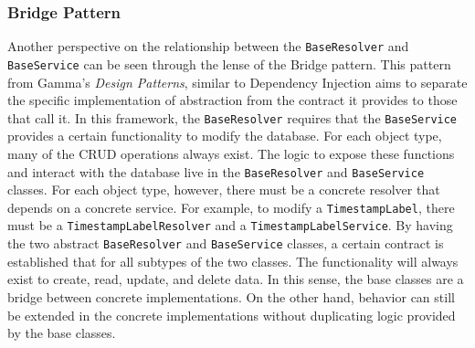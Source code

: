 \subsubsection{Bridge Pattern}
Another perspective on the relationship between the \verb!BaseResolver! and \verb!BaseService! can be seen through the lense of the Bridge pattern.  This pattern from Gamma's \textit{Design Patterns}, similar to Dependency Injection aims to separate the specific implementation of abstraction from the contract it provides to those that call it. In this framework, the \verb!BaseResolver! requires that the \verb!BaseService! provides a certain functionality to modify the database.  For each object type, many of the CRUD operations always exist.  The logic to expose these functions and interact with the database live in the \verb!BaseResolver! and \verb!BaseService! classes.  For each object type, however, there must be a concrete resolver that depends on a concrete service. For example, to modify a \verb!TimestampLabel!, there must be a \verb!TimestampLabelResolver! and a \verb!TimestampLabelService!.  By having the two abstract \verb!BaseResolver! and \verb!BaseService! classes, a certain contract is established that for all subtypes of the two classes. The functionality will always exist to create, read, update, and delete data.  In this sense, the base classes are a bridge between concrete implementations. On the other hand, behavior can still be extended in the concrete implementations without duplicating logic provided by the base classes.